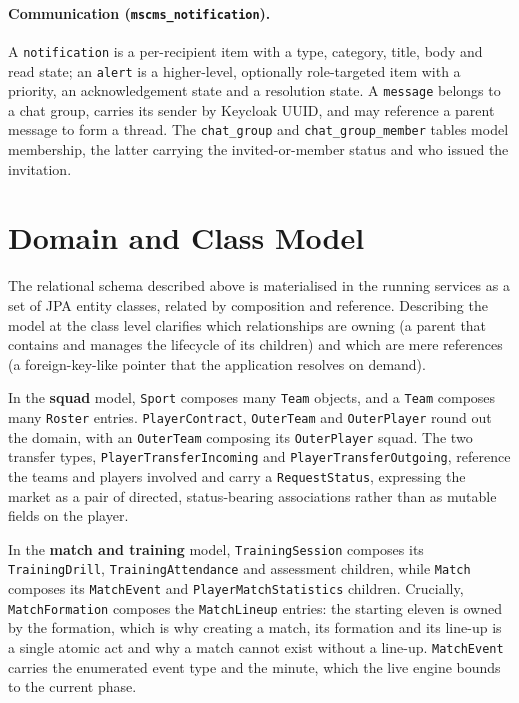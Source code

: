 \paragraph{Communication (\texttt{mscms\_notification}).} A \texttt{notification} is a
per-recipient item with a type, category, title, body and read state; an \texttt{alert}
is a higher-level, optionally role-targeted item with a priority, an acknowledgement
state and a resolution state. A \texttt{message} belongs to a chat group, carries its
sender by Keycloak UUID, and may reference a parent message to form a thread. The
\texttt{chat\_group} and \texttt{chat\_group\_member} tables model membership, the latter
carrying the invited-or-member status and who issued the invitation.

\section{Domain and Class Model}
\label{sec:domain-model}

The relational schema described above is materialised in the running services as a set
of JPA entity classes, related by composition and reference. Describing the model at
the class level clarifies which relationships are owning (a parent that contains and
manages the lifecycle of its children) and which are mere references (a foreign-key-like
pointer that the application resolves on demand).

In the \textbf{squad} model, \texttt{Sport} composes many \texttt{Team} objects, and a
\texttt{Team} composes many \texttt{Roster} entries. \texttt{PlayerContract},
\texttt{OuterTeam} and \texttt{OuterPlayer} round out the domain, with an
\texttt{OuterTeam} composing its \texttt{OuterPlayer} squad. The two transfer types,
\texttt{PlayerTransferIncoming} and \texttt{PlayerTransferOutgoing}, reference the teams
and players involved and carry a \texttt{RequestStatus}, expressing the market as a pair
of directed, status-bearing associations rather than as mutable fields on the player.

In the \textbf{match and training} model, \texttt{TrainingSession} composes its
\texttt{TrainingDrill}, \texttt{TrainingAttendance} and assessment children, while
\texttt{Match} composes its \texttt{MatchEvent} and \texttt{PlayerMatchStatistics}
children. Crucially, \texttt{MatchFormation} composes the \texttt{MatchLineup} entries:
the starting eleven is owned by the formation, which is why creating a match, its
formation and its line-up is a single atomic act and why a match cannot exist without a
line-up. \texttt{MatchEvent} carries the enumerated event type and the minute, which the
live engine bounds to the current phase.

